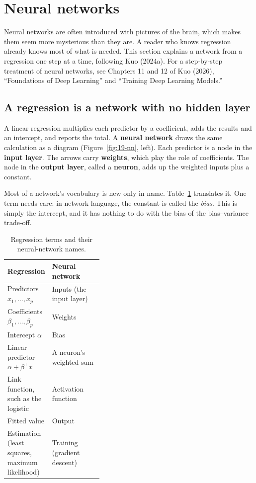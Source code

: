\section{Neural networks}
\label{sec:19-nn}


Neural networks are often introduced with pictures of the brain, which makes them seem more mysterious than they are. A reader who knows regression already knows most of what is needed. This section explains a network from a regression one step at a time, following Kuo (2024a). For a step-by-step treatment of neural networks, see Chapters 11 and 12 of Kuo (2026), ``Foundations of Deep Learning'' and ``Training Deep Learning Models.''

\subsection{A regression is a network with no hidden layer}

A linear regression multiplies each predictor by a coefficient, adds the results and an intercept, and reports the total. A \textbf{neural network} draws the same calculation as a diagram (Figure~\ref{fig:19-nn}, left). Each predictor is a node in the \textbf{input layer}. The arrows carry \textbf{weights}, which play the role of coefficients. The node in the \textbf{output layer}, called a \textbf{neuron}, adds up the weighted inputs plus a constant.

Most of a network's vocabulary is new only in name. Table~\ref{tab:19-nnterms} translates it. One term needs care: in network language, the constant is called the \emph{bias}. This is simply the intercept, and it has nothing to do with the bias of the bias--variance trade-off.

\begin{table}[htbp]
\centering
\small
\caption{Regression terms and their neural-network names.}
\label{tab:19-nnterms}
\begin{tabularx}{0.85\linewidth}{@{}>{\raggedright\arraybackslash}p{0.38\linewidth}>{\raggedright\arraybackslash}X@{}}
\toprule
Regression & Neural network \\
\midrule
Predictors $x_1, \dots, x_p$ & Inputs (the input layer) \\
Coefficients $\beta_1, \dots, \beta_p$ & Weights \\
Intercept $\alpha$ & Bias \\
Linear predictor $\alpha + \beta^{\top}x$ & A neuron's weighted sum \\
Link function, such as the logistic & Activation function \\
Fitted value & Output \\
Estimation (least squares, maximum likelihood) & Training (gradient descent) \\
\bottomrule
\end{tabularx}
\end{table}

